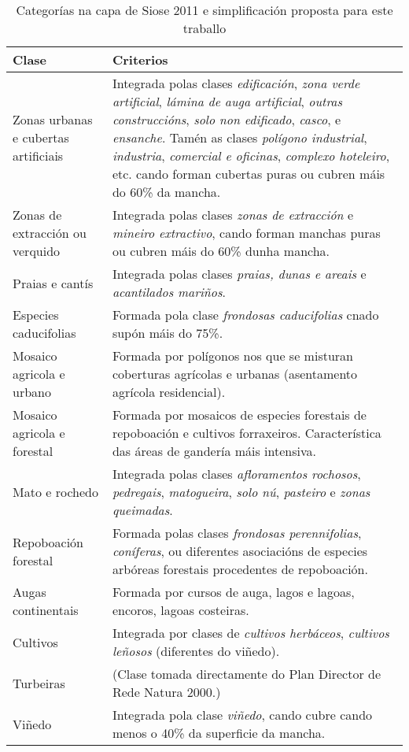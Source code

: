 \documentclass[11pt,a4paper]{article}
\begin{document}
\begin{table}
\caption{Categorías na capa de Siose 2011 e simplificación proposta para este traballo} \label{cadroSIOSE}
\begin{center}
\begin{small}
\begin{tabular}{p{}p{}}
\toprule
Clase & Criterios \\
\midrule
Zonas urbanas e cubertas artificiais & Integrada polas clases \emph{edificación}, \emph{zona verde artificial}, \emph{lámina de auga artificial}, \emph{outras construccións}, \emph{solo non edificado}, \emph{casco}, e \emph{ensanche}. Tamén as clases \emph{polígono industrial}, \emph{industria}, \emph{comercial e oficinas}, \emph{complexo hoteleiro}, etc. cando forman cubertas puras ou cubren máis do 60\% da mancha.  \\
Zonas de extracción ou verquido & Integrada polas clases \emph{zonas de extracción} e \emph{mineiro extractivo}, cando forman manchas puras ou cubren máis do 60\% dunha mancha.\\
Praias e cantís & Integrada polas clases \emph{praias, dunas e areais} e \emph{acantilados mariños}. \\
Especies caducifolias & Formada pola clase \emph{frondosas caducifolias} cnado supón máis do 75\%. \\
Mosaico agricola e urbano & Formada por polígonos nos que se misturan coberturas agrícolas e urbanas (asentamento agrícola residencial). \\
Mosaico agricola e forestal & Formada por mosaicos de especies forestais de repoboación e cultivos forraxeiros. Característica das áreas de gandería máis intensiva.\\
Mato e rochedo & Integrada polas clases \emph{afloramentos rochosos}, \emph{pedregais}, \emph{matogueira}, \emph{solo nú}, \emph{pasteiro} e \emph{zonas queimadas}. \\
Repoboación forestal & Formada polas clases \emph{frondosas perennifolias}, \emph{coníferas}, ou diferentes asociacións de especies arbóreas forestais procedentes de repoboación. \\
Augas continentais & Formada por cursos de auga, lagos e lagoas, encoros, lagoas costeiras.\\
Cultivos & Integrada por clases de \emph{cultivos herbáceos}, \emph{cultivos leñosos} (diferentes do viñedo). \\
Turbeiras & (Clase tomada directamente do Plan Director de Rede Natura 2000.) \\
Viñedo & Integrada pola clase \emph{viñedo}, cando cubre cando menos o 40\% da superficie da mancha. \\
\bottomrule
\end{tabular}
\end{small}
\end{center}
\end{table}
\end{document}

